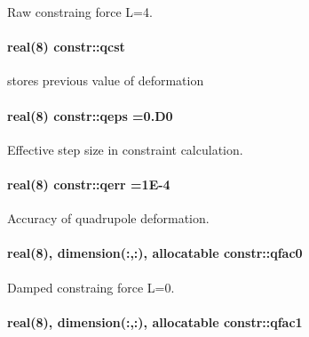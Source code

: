 Raw constraing force L=4. 

\paragraph[{\texorpdfstring{qcst}{qcst}}]{\setlength{\rightskip}{0pt plus 5cm}real(8) constr\+::qcst}\hypertarget{namespaceconstr_a88ea236140e2db61760449c622b6aefb}{}\label{namespaceconstr_a88ea236140e2db61760449c622b6aefb}


stores previous value of deformation 

\paragraph[{\texorpdfstring{qeps}{qeps}}]{\setlength{\rightskip}{0pt plus 5cm}real(8) constr\+::qeps =0.\+D0}\hypertarget{namespaceconstr_a16ee5bae6ffa0fec223e35ca042499a8}{}\label{namespaceconstr_a16ee5bae6ffa0fec223e35ca042499a8}


Effective step size in constraint calculation. 

\paragraph[{\texorpdfstring{qerr}{qerr}}]{\setlength{\rightskip}{0pt plus 5cm}real(8) constr\+::qerr =1\+E-\/4}\hypertarget{namespaceconstr_a4e28cb213fb0c9679bdcca7dd4c64542}{}\label{namespaceconstr_a4e28cb213fb0c9679bdcca7dd4c64542}


Accuracy of quadrupole deformation. 

\paragraph[{\texorpdfstring{qfac0}{qfac0}}]{\setlength{\rightskip}{0pt plus 5cm}real(8), dimension(\+:,\+:), allocatable constr\+::qfac0}\hypertarget{namespaceconstr_abe00dd6a7a2fb5c37a87dd62dbcfa67a}{}\label{namespaceconstr_abe00dd6a7a2fb5c37a87dd62dbcfa67a}


Damped constraing force L=0. 

\paragraph[{\texorpdfstring{qfac1}{qfac1}}]{\setlength{\rightskip}{0pt plus 5cm}real(8), dimension(\+:,\+:), allocatable constr\+::qfac1}\hypertarget{namespaceconstr_a53efe856c63b5d63637c1aa813a3a205}{}\label{namespaceconstr_a53efe856c63b5d63637c1aa813a3a205}


